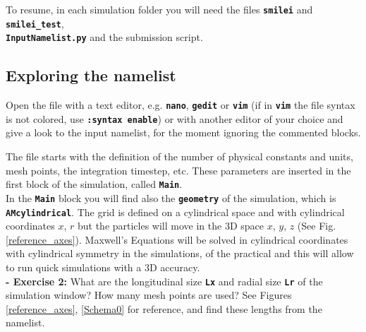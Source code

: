 \documentclass[a4paper,12pt]{extarticle}
\newcommand{\commandline}[1]{\texttt{\textbf{#1}}}
\begin{document}
To resume, in each simulation folder you will need the files \commandline{smilei} and \commandline{smilei\_test},\\ \commandline{InputNamelist.py} and the submission script.

\subsection{Exploring the namelist}
Open the file with a text editor, e.g. \commandline{nano}, \commandline{gedit} or \commandline{vim} (if in \commandline{vim} the file syntax is not colored, use \commandline{:syntax enable}) or with another editor of your choice and give a look to the input namelist, for the moment ignoring the commented blocks. 

The file starts with the definition of the number of physical constants and units, mesh points, the integration timestep, etc. These parameters are inserted in the first block of the simulation, called \commandline{Main}.\\

In the  \commandline{Main} block you will find also the  \commandline{geometry} of the simulation, which is \commandline{AMcylindrical}. The grid is  defined on a cylindrical space and with cylindrical coordinates $x$, $r$ but the particles will move in the 3D  space $x$, $y$, $z$ (See Fig. \ref{reference_axes}). Maxwell's Equations will be solved in cylindrical coordinates with cylindrical symmetry in the simulations, of the practical and this will allow to run quick simulations with a 3D accuracy.\\

\textbf{ - Exercise 2:} What are the longitudinal size \commandline{Lx} and radial size \commandline{Lr} of the simulation window? How many mesh points are used? See Figures \ref{reference_axes}, \ref{Schema0} for reference,  and find these lengths from the namelist.
\end{document}
